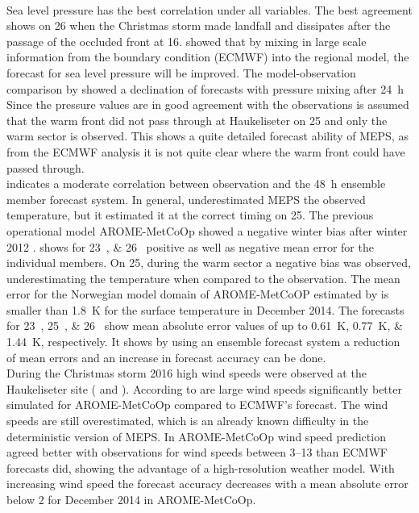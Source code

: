 \\
Sea level pressure has the best correlation under all variables. The best agreement shows on \SI{26}{\dec} when the Christmas storm made landfall and dissipates after the passage of the occluded front at \SI{16}{\UTC}. \citet{dahlgren_comparison_2013} showed that by mixing in large scale information from the boundary condition (ECMWF) into the regional model, the forecast for sea level pressure will be improved. The model-observation comparison by \citet{dahlgren_comparison_2013} showed a declination of forecasts with pressure mixing after \SI{24}{\hour} 
Since the pressure values are in good agreement with the observations is assumed that the warm front did not pass through at Haukeliseter on \SI{25}{\dec} and only the warm sector is observed. This shows a quite detailed forecast ability of MEPS, as from the ECMWF analysis it is not quite clear where the warm front could have passed through. 
\\
 indicates a moderate correlation between observation and the \SI{48}{\hour} ensemble member forecast system. In general, underestimated MEPS the observed temperature, but it estimated it at the correct timing on \SI{25}{\dec}. The previous operational model AROME-MetCoOp showed a negative winter bias after winter 2012 \citep{muller_arome-metcoop:_2017}.  shows for \SIlist{23;26}{\dec} positive as well as negative mean error for the individual members. On \SI{25}{\dec}, during the warm sector a negative bias was observed, underestimating the temperature when compared to the observation. The mean error for the Norwegian model domain of AROME-MetCoOP estimated by \citet{muller_arome-metcoop:_2017} is smaller than \SI{1.8}{\kelvin} for the surface temperature in December 2014. The forecasts for \SIlist{23;25;26}{\dec} show mean absolute error values of up to \SIlist{0.61;0.77;1.44}{\kelvin}, respectively. It shows by using an ensemble forecast system a reduction of mean errors and an increase in forecast accuracy can be done. 
\\
During the Christmas storm 2016 high wind speeds were observed at the Haukeliseter site ( and ).
According to \citet{muller_arome-metcoop:_2017} are large wind speeds significantly better simulated for AROME-MetCoOp compared to ECMWF's forecast. The wind speeds are still overestimated, which is an already known difficulty in the deterministic version of MEPS. In AROME-MetCoOp wind speed prediction agreed better with observations for wind speeds between \SIrange{3}{13}{\mPs} than ECMWF forecasts did, showing the advantage of a high-resolution weather model. With increasing wind speed the forecast accuracy decreases with a mean absolute error below \SI{2}{\mPs} for December 2014 in AROME-MetCoOp.
